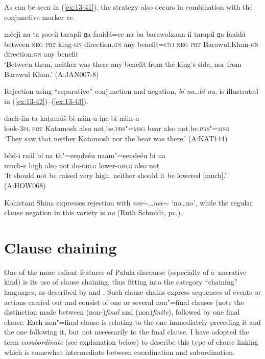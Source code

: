 As can be seen in (\ref{ex:13-41}), the strategy also occurs in combination with the conjunctive marker \textit{ee}.

\begin{exe}
\ex
\label{ex:13-41}
\gll méeǰi na ta ṣoo-íi tarapíi ɡa faaidá=ee na ba barawolxaan-íi tarapíi ɡa faaidá \\
between \textsc{neg} \textsc{prt } king-\textsc{gn} direction.\textsc{gn} any benefit=\textsc{cnj} \textsc{neg} \textsc{prt} Barawul.Khan-\textsc{gn} direction.\textsc{gn} any benefit  \\
\glt `Between them, neither was there any benefit from the king's side, nor from Barawul Khan.' (A:JAN007-8) 
\end{exe}

Rejection using ``separative'' conjunction and negation, \textit{bi na{\ldots}bi na}, is illustrated in (\ref{ex:13-42})--(\ref{ex:13-43}).

\begin{exe}
\ex
\label{ex:13-42}
\gll dac̣h-íin ta kaṭamúš bi náin-u iṇc̣ bi náin-u \\
look-\textsc{3pl} \textsc{prt} Katamosh also not.be.\textsc{prs"=msg} bear also not.be.\textsc{prs"=msg} \\
\glt `They saw that neither Katamosh nor the bear was there.' (A:KAT144)

\ex
\label{ex:13-43}
\gll bíiḍ-i raál bi na th"=eeṇḍeéu naam"=eeṇḍeéu bi na \\
much-\textsc{f} high also not do-\textsc{oblg} lower-\textsc{oblg} also not  \\
\glt `It should not be raised very high, neither should it be lowered [much].' (A:HOW068) 
\end{exe}

Kohistani Shina expresses rejection with \textit{nee$\sim${\ldots}nee$\sim$} `no{\ldots}no', while the regular clause negation in this variety is \textit{na} (Ruth Schmidt, pc.).


\section{Clause chaining}
\label{sec:13-3}

One of the more salient features of Palula discourse (especially of a~narrative kind) is its use of clause chaining, thus fitting into the category ``chaining'' languages, as described by \citet[242]{thompsonetal2007} and \citet[374--376]{longacre2007}. Such clause chains express sequences of events or actions carried out and consist of one or several non"=final clauses (note the distinction made between (non-)\textit{final} and (non)\textit{finite}), followed by one final clause. Each non"=final clause is relating to the one immediately preceding it and the one following it, but not necessarily to the final clause. I have adopted the term \textit{cosubordinate} (see explanation below) to describe this type of clause linking which is somewhat intermediate between coordination and subordination.


